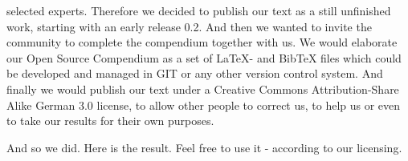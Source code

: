 \begin{description}
  selected experts. Therefore we decided to publish our text as a still
  unfinished work, starting with an early release 0.2. And then we wanted
  to invite the community to complete the compendium together with us. We would elaborate our Open
  Source Compendium as a set of LaTeX- and BibTeX files which could be developed
  and managed in GIT or any other version control system. And finally we would
  publish our text under a Creative Commons Attribution-Share Alike German 3.0
  license, to allow other people to correct
  us, to help us or even to take our results for their own purposes.
\end{description}

And so we did. Here is the result. Feel free to use it - according to our
licensing.

%
